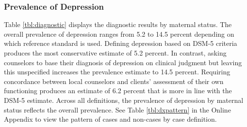 \documentclass[man,natbib,longtable]{apa6}\usepackage[]{graphicx}\usepackage[]{color}
\begin{document}
\begin{table}[H]
\end{table}

\subsubsection{Prevalence of Depression}

Table \ref{tbl:diagnostic} displays the diagnostic results by maternal status. The overall prevalence of depression ranges from 5.2 to 14.5 percent depending on which reference standard is used. Defining depression based on DSM-5 criteria produces the most conservative estimate of 5.2 percent. In contrast, asking counselors to base their diagnosis of depression on clinical judgment but leaving this unspecified increases the prevalence estimate to 14.5 percent. Requiring concordance between local counselors and clients' assessment of their own functioning produces an estimate of 6.2 percent that is more in line with the DSM-5 estimate. Across all definitions, the prevalence of depression by maternal status reflects the overall prevalence. See Table \ref{tbl:dxpattern} in the Online Appendix to view the pattern of cases and non-cases by case definition.
\end{document}
